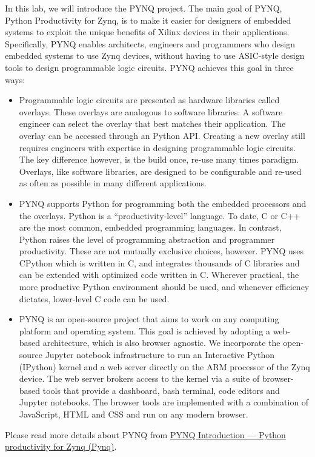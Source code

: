 \documentclass[a4paper,12pt,twoside]{article}
\begin{document}
In this lab, we will introduce the PYNQ project. The main goal of PYNQ, Python Productivity for Zynq, is to make it easier for designers of embedded systems to exploit the unique benefits of Xilinx devices in their applications. Specifically, PYNQ enables architects, engineers and programmers who design embedded systems to use Zynq devices, without having to use ASIC-style design tools to design programmable logic circuits. PYNQ achieves this goal in three ways:
\begin{itemize}
    \item Programmable logic circuits are presented as hardware libraries called overlays. These overlays are analogous to software libraries. A software engineer can select the overlay that best matches their application. The overlay can be accessed through an Python API. Creating a new overlay still requires engineers with expertise in designing programmable logic circuits. The key difference however, is the build once, re-use many times paradigm. Overlays, like software libraries, are designed to be configurable and re-used as often as possible in many different applications.
    \item PYNQ supports Python for programming both the embedded processors and the overlays. Python is a “productivity-level” language. To date, C or C++ are the most common, embedded programming languages. In contrast, Python raises the level of programming abstraction and programmer productivity. These are not mutually exclusive choices, however. PYNQ uses CPython which is written in C, and integrates thousands of C libraries and can be extended with optimized code written in C. Wherever practical, the more productive Python environment should be used, and whenever efficiency dictates, lower-level C code can be used.
    \item PYNQ is an open-source project that aims to work on any computing platform and operating system. This goal is achieved by adopting a web-based architecture, which is also browser agnostic. We incorporate the open-source Jupyter notebook infrastructure to run an Interactive Python (IPython) kernel and a web server directly on the ARM processor of the Zynq device. The web server brokers access to the kernel via a suite of browser-based tools that provide a dashboard, bash terminal, code editors and Jupyter notebooks. The browser tools are implemented with a combination of JavaScript, HTML and CSS and run on any modern browser.
\end{itemize}
Please read more details about PYNQ from \href{https://pynq.readthedocs.io/en/latest/}{PYNQ Introduction — Python productivity for Zynq (Pynq)}.
\end{document}
